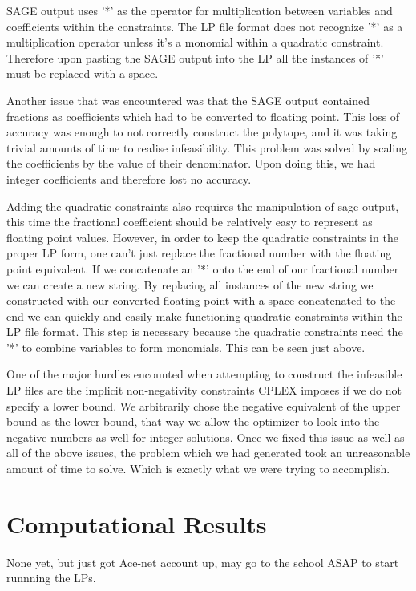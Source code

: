 \documentclass[11pt]{article} %
\theoremstyle{definition}
\theoremstyle{remark}
\begin{document}
SAGE output uses '*' as the operator for multiplication between variables and coefficients within the constraints. The LP file format does not recognize '*' as a multiplication operator unless it's a monomial within a quadratic constraint. Therefore upon pasting the SAGE output into the LP all the instances of '*' must be replaced with a space. 

Another issue that was encountered was that the SAGE output contained fractions as coefficients which had to be converted to floating point. This loss of accuracy was enough to not correctly construct the polytope, and it was taking trivial amounts of time to realise infeasibility. This problem was solved by scaling the coefficients by the value of their denominator. Upon doing this, we had integer coefficients and therefore lost no accuracy.

Adding the quadratic constraints also requires the manipulation of sage output, this time the fractional coefficient should be relatively easy to represent as floating point values. However, in order to keep the quadratic constraints in the proper LP form, one can't just replace the fractional number with the floating point equivalent. If we concatenate an '*' onto the end of our fractional number we can create a new string. By replacing all instances of the new string we constructed with our converted floating point with a space concatenated to the end we can quickly and easily make functioning quadratic constraints within the LP file format. This step is necessary because the quadratic constraints need the '*' to combine variables to form monomials. This can be seen just above. 

One of the major hurdles encounted when attempting to construct the infeasible LP files are the implicit non-negativity constraints CPLEX imposes if we do not specify a lower bound.
We arbitrarily chose the negative equivalent of the upper bound as the lower bound, that way we allow the optimizer to look into the negative numbers as well for integer solutions. Once we fixed this issue as well as all of the above issues, the problem which we had generated took an unreasonable amount of time to solve. Which is exactly what we were trying to accomplish.

\section{Computational Results}

None yet, but just got Ace-net account up, may go to the school ASAP to start runnning the LPs.
\end{document}
